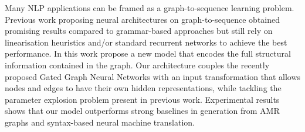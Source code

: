 Many NLP applications can be framed as a graph-to-sequence learning problem. Previous work proposing neural architectures on graph-to-sequence obtained promising results compared to grammar-based approaches but still rely on linearisation heuristics and/or standard recurrent networks to achieve the best performance. In this work propose a new model that encodes the full structural information contained in the graph. Our architecture couples the recently proposed Gated Graph Neural Networks with an input transformation that allows nodes and edges to have their own hidden representations, while tackling the parameter explosion problem present in previous work. Experimental results shows that our model outperforms strong baselines in generation from AMR graphs and syntax-based neural machine translation.
